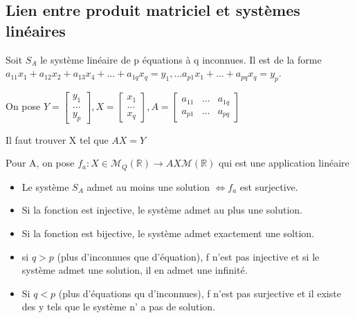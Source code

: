 \documentclass[french]{yLectureNote}
\newcommand{\R}[0]{\mathbb{R}}
\newcommand{\mc}{\mathcal}
\begin{document}
\subsection{Lien entre produit matriciel et systèmes linéaires}
Soit \(S_A\) le système linéaire de p équations à q inconnues. Il est de la forme \(a_{11}x_1+a_{12}x_2 + a_{13}x_4+\dots+a_{1q}x_q = y_1, \dots a_{p1}x_1 + \dots + a_{pq}x_q  = y_p\).

On pose \(Y = \begin{bmatrix}
 y_1 \\
 \dots\\
 y_p
\end{bmatrix}, X = \begin{bmatrix}
 x_1 \\
 \dots\\
 x_q
\end{bmatrix}, A = \begin{bmatrix}
 a_{11}&\dots&a_{1q} \\
a_{p1}&\dots&a_{pq}
\end{bmatrix}\)

Il faut trouver X tel que \(AX=Y\)
\begin{definition}
Pour A, on pose \(f_a:X\in \mc{M}_Q(\R)\to AX\mc{M}(\R)\) qui est une application linéaire
\end{definition}
\begin{proposition}
\begin{itemize}
 \item Le système \(S_A\) admet au moins une solution \(\iff f_a\) est surjective.
 \item Si la fonction est injective, le système admet au plus une solution.
 \item Si la fonction est bijective, le système admet exactement une soltion.
  \item si \(q>p\) (plus d'inconnues que d'équation), f n'est pas injective et si le système admet une solution, il en admet une infinité.
 \item Si \(q<p\) (plus d'équations qu d'inconnues), f n'est pas surjective et il existe des y tels que le système n' a pas de solution.
\end{itemize}
\end{proposition}
\end{document}
